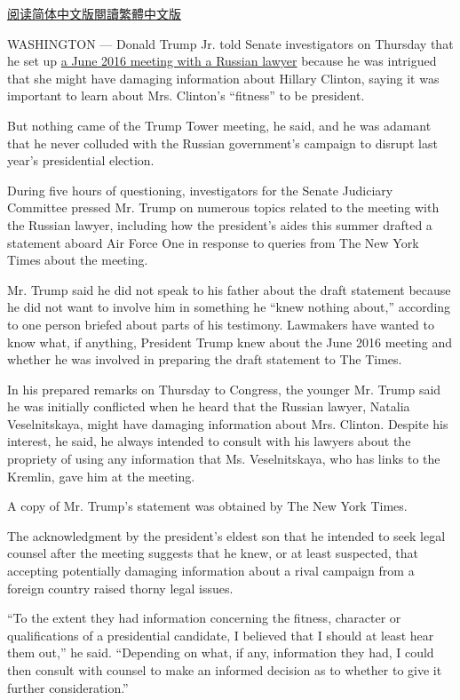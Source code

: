 \href{https://cn.nytimes3xbfgragh.onion/usa/20170908/trump-russia-investigation/}{阅读简体中文版}\href{https://cn.nytimes3xbfgragh.onion/usa/20170908/trump-russia-investigation/zh-hant/}{閱讀繁體中文版}

WASHINGTON --- Donald Trump Jr. told Senate investigators on Thursday
that he set up
\href{https://www.nytimes3xbfgragh.onion/2017/07/09/us/politics/trump-russia-kushner-manafort.html}{a
June 2016 meeting with a Russian lawyer} because he was intrigued that
she might have damaging information about Hillary Clinton, saying it was
important to learn about Mrs. Clinton's ``fitness'' to be president.

But nothing came of the Trump Tower meeting, he said, and he was adamant
that he never colluded with the Russian government's campaign to disrupt
last year's presidential election.

During five hours of questioning, investigators for the Senate Judiciary
Committee pressed Mr. Trump on numerous topics related to the meeting
with the Russian lawyer, including how the president's aides this summer
drafted a statement aboard Air Force One in response to queries from The
New York Times about the meeting.

Mr. Trump said he did not speak to his father about the draft statement
because he did not want to involve him in something he ``knew nothing
about,'' according to one person briefed about parts of his testimony.
Lawmakers have wanted to know what, if anything, President Trump knew
about the June 2016 meeting and whether he was involved in preparing the
draft statement to The Times.

In his prepared remarks on Thursday to Congress, the younger Mr. Trump
said he was initially conflicted when he heard that the Russian lawyer,
Natalia Veselnitskaya, might have damaging information about Mrs.
Clinton. Despite his interest, he said, he always intended to consult
with his lawyers about the propriety of using any information that Ms.
Veselnitskaya, who has links to the Kremlin, gave him at the meeting.

A copy of Mr. Trump's statement was obtained by The New York Times.

The acknowledgment by the president's eldest son that he intended to
seek legal counsel after the meeting suggests that he knew, or at least
suspected, that accepting potentially damaging information about a rival
campaign from a foreign country raised thorny legal issues.

``To the extent they had information concerning the fitness, character
or qualifications of a presidential candidate, I believed that I should
at least hear them out,'' he said. ``Depending on what, if any,
information they had, I could then consult with counsel to make an
informed decision as to whether to give it further consideration.''

